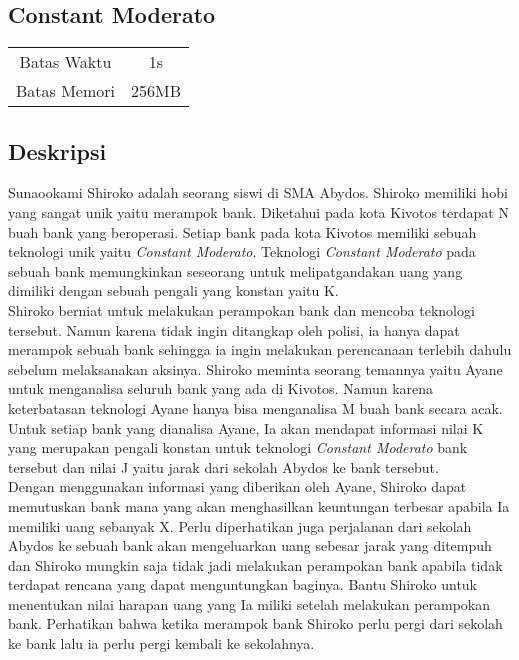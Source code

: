 \documentclass{article}
\begin{document}
\begin{center}

    
    \section*{Constant Moderato} %

    \begin{tabular}{ | c c | }
        \hline
        Batas Waktu  & 1s \\    %
        Batas Memori & 256MB \\  %
        \hline
    \end{tabular}
\end{center}

\subsection*{Deskripsi}

Sunaookami Shiroko adalah seorang siswi di SMA Abydos. Shiroko memiliki hobi yang sangat unik yaitu merampok bank. Diketahui pada kota Kivotos terdapat N buah bank yang beroperasi. Setiap bank pada kota Kivotos memiliki sebuah teknologi unik yaitu \emph{Constant Moderato}. Teknologi \emph{Constant Moderato} pada sebuah bank memungkinkan seseorang untuk melipatgandakan uang yang dimiliki dengan sebuah pengali yang konstan yaitu K.\\

Shiroko berniat untuk melakukan perampokan bank dan mencoba teknologi tersebut. Namun karena tidak ingin ditangkap oleh polisi, ia hanya dapat merampok sebuah bank sehingga ia ingin melakukan perencanaan terlebih dahulu sebelum melaksanakan aksinya. Shiroko meminta seorang temannya yaitu Ayane untuk menganalisa seluruh bank yang ada di Kivotos. Namun karena keterbatasan teknologi Ayane hanya bisa menganalisa M buah bank secara acak. Untuk setiap bank yang dianalisa Ayane, Ia akan mendapat informasi nilai K yang merupakan pengali konstan untuk teknologi \emph{Constant Moderato} bank tersebut dan nilai J yaitu jarak dari sekolah Abydos ke bank tersebut.\\

Dengan menggunakan informasi yang diberikan oleh Ayane, Shiroko dapat memutuskan bank mana yang akan menghasilkan keuntungan terbesar apabila Ia memiliki uang sebanyak X. Perlu diperhatikan juga perjalanan dari sekolah Abydos ke sebuah bank akan mengeluarkan uang sebesar jarak yang ditempuh dan Shiroko mungkin saja tidak jadi melakukan perampokan bank apabila tidak terdapat rencana yang dapat menguntungkan baginya. Bantu Shiroko untuk menentukan nilai harapan uang yang Ia miliki setelah melakukan perampokan bank. Perhatikan bahwa ketika merampok bank Shiroko perlu pergi dari sekolah ke bank lalu ia perlu pergi kembali ke sekolahnya.\\
\end{document}

